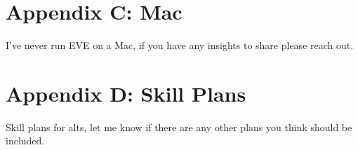\documentclass{article}
\begin{document}



\section*{Appendix C: Mac}
I've never run EVE on a Mac, if you have any insights to share please reach out.

\section*{Appendix D: Skill Plans}
Skill plans for alts, let me know if there are any other plans you think should be included.
\end{document}
